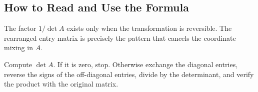 \subsection{How to Read and Use the Formula}

\begin{interpretationbox}
The factor $1/\det A$ exists only when the transformation is reversible. The rearranged entry matrix is precisely the pattern that cancels the coordinate mixing in $A$.
\end{interpretationbox}

\begin{summarybox}
Compute $\det A$. If it is zero, stop. Otherwise exchange the diagonal entries, reverse the signs of the off-diagonal entries, divide by the determinant, and verify the product with the original matrix.
\end{summarybox}
